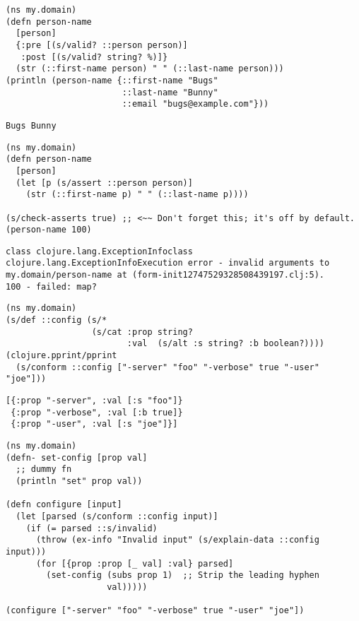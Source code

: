 \documentclass[10pt,oneside,x11names]{article}
\begin{document}
\begin{verbatim}
(ns my.domain)
(defn person-name
  [person]
  {:pre [(s/valid? ::person person)]
   :post [(s/valid? string? %)]}
  (str (::first-name person) " " (::last-name person)))
(println (person-name {::first-name "Bugs"
                       ::last-name "Bunny"
                       ::email "bugs@example.com"}))
\end{verbatim}

\begin{verbatim}
Bugs Bunny
\end{verbatim}


\begin{verbatim}
(ns my.domain)
(defn person-name
  [person]
  (let [p (s/assert ::person person)]
    (str (::first-name p) " " (::last-name p))))

(s/check-asserts true) ;; <~~ Don't forget this; it's off by default.
(person-name 100)
\end{verbatim}

\begin{verbatim}
class clojure.lang.ExceptionInfoclass clojure.lang.ExceptionInfoExecution error - invalid arguments to my.domain/person-name at (form-init12747529328508439197.clj:5).
100 - failed: map?
\end{verbatim}


\begin{verbatim}
(ns my.domain)
(s/def ::config (s/*
                 (s/cat :prop string?
                        :val  (s/alt :s string? :b boolean?))))
(clojure.pprint/pprint
  (s/conform ::config ["-server" "foo" "-verbose" true "-user" "joe"]))
\end{verbatim}

\begin{verbatim}
[{:prop "-server", :val [:s "foo"]}
 {:prop "-verbose", :val [:b true]}
 {:prop "-user", :val [:s "joe"]}]
\end{verbatim}


\begin{verbatim}
(ns my.domain)
(defn- set-config [prop val]
  ;; dummy fn
  (println "set" prop val))

(defn configure [input]
  (let [parsed (s/conform ::config input)]
    (if (= parsed ::s/invalid)
      (throw (ex-info "Invalid input" (s/explain-data ::config input)))
      (for [{prop :prop [_ val] :val} parsed]
        (set-config (subs prop 1)  ;; Strip the leading hyphen
                    val)))))

(configure ["-server" "foo" "-verbose" true "-user" "joe"])
\end{verbatim}
\end{document}
